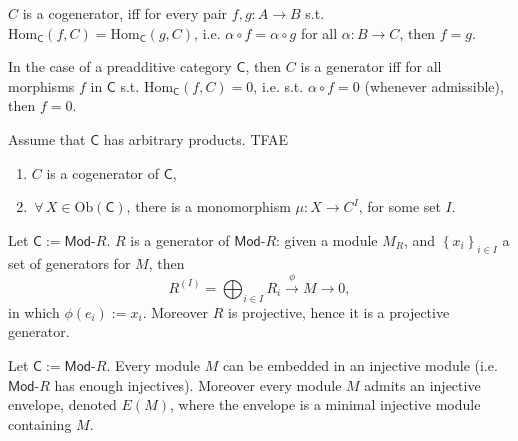\begin{rem}
	$C$ is a cogenerator, iff for every pair $f,g: A \to B$
	s.t. $\mathrm{Hom}_{\mathsf{C}} \left( f, C \right) = \mathrm{Hom}_{\mathsf{C}} \left( g, C \right)$,
	i.e. $\alpha \circ f = \alpha \circ g$ for all $\alpha: B \to C$, then $f = g$.

	In the case of a preadditive category $\mathsf{C}$, then $C$ is a generator iff
	for all morphisms $f$ in $\mathsf{C}$ s.t. $\mathrm{Hom}_{\mathsf{C}} \left( f, C \right) = 0$,
	i.e. s.t. $\alpha \circ f = 0$ (whenever admissible), then $f = 0$.
\end{rem}

\begin{prop}
	Assume that $\mathsf{C}$ has arbitrary products.
	TFAE
	\begin{enumerate}
		\item $C$ is a cogenerator of $\mathsf{C}$,
		\item $\,\forall\, X \in \mathrm{Ob} \left(\mathsf{C}\right)$, there is a monomorphism
			$\mu: X \to C^{I}$, for some set $I$.
	\end{enumerate}
\end{prop} 

\begin{ex}
	Let $\mathsf{C} := \mathsf{Mod}\text{-}R$.
	$R$ is a generator of $\mathsf{Mod}\text{-}R$:
	given a module $M_R$, and $\left\{ x_i \right\}_{i \in I}$ a set of generators for $M$, then
	\begin{equation}
		R^{(I)} = \bigoplus_{i \in I} R_i \xrightarrow{\phi} M \to 0
	,\end{equation} 
	in which $\phi(e_i) := x_i$.
	Moreover $R$ is projective, hence it is a projective generator.
\end{ex} 

\begin{rem}
	Let $\mathsf{C} := \mathsf{Mod}\text{-}R$.
	Every module $M$ can be embedded in an injective module
	(i.e. $\mathsf{Mod}\text{-}R$ has enough injectives).
	Moreover every module $M$ admits an injective envelope, denoted $E(M)$,
	where the envelope is a minimal injective module containing $M$.
\end{rem}

